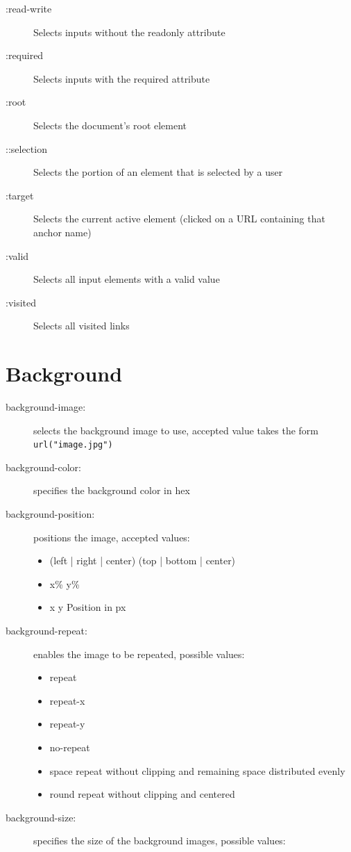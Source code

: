 \documentclass[12pt, a4paper]{article}
\begin{document}
\begin{multicols}{2}
\begin{description}
			\item[:read-write] Selects inputs without the readonly attribute
			\item[:required] Selects inputs with the required attribute
			\item[:root] Selects the document's root element
			\item[::selection] Selects the portion of an element that is selected by a user
			\item[:target] Selects the current active element (clicked on a URL containing that anchor name)
			\item[:valid] Selects all input elements with a valid value
			\item[:visited] Selects all visited links
		\end{description}
		
		\section{Background}
		\begin{description}
			\item[background-image:] selects the background image to use, accepted value takes the form \texttt{url("image.jpg")}
			\item[background-color:] specifies the background color in hex
			\item[background-position:] positions the image, accepted values: 
			\begin{itemize}
				\item (left | right | center) (top | bottom | center)
				\item x\% y\%
				\item x y 
				\subitem Position in px
			\end{itemize}
			\item[background-repeat:] enables the image to be repeated, possible values:
			\begin{itemize}
				\item repeat
				\item repeat-x
				\item repeat-y
				\item no-repeat
				\item space
				\subitem repeat without clipping and remaining space distributed evenly
				\item round
				\subitem repeat without clipping and centered	
			\end{itemize}
			\item[background-size:] specifies the size of the background images, possible values:

\end{description}
\end{multicols}
\end{document}
